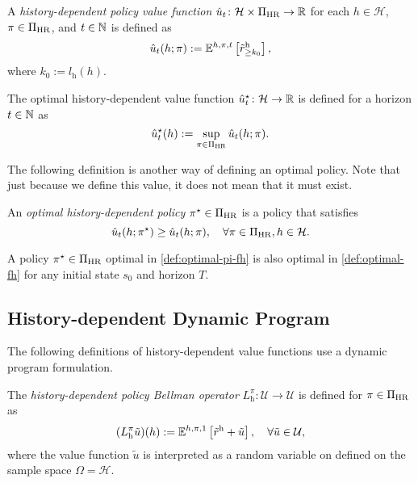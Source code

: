 \begin{definition} \label{def:u-pi}
A \emph{history-dependent policy value function} $\hat{u}_t\colon \mathcal{H} \times \Pi_{\mathrm{HR}} \to \mathbb{R}$ for each $h\in \mathcal{H}$, $\pi \in \Pi_{\mathrm{HR}}$, and $t\in \mathbb{N}$ is defined as
  \[
   \hat{u}_t(h; \pi) := \mathbb{E}^{h, \pi, t} \left[ \tilde{r}^{\mathrm{h}}_{\ge k_0} \right],
 \]
 where $k_0 := l_{\mathrm{h}}(h)$.
  \leanok
\end{definition}


\begin{definition}
The optimal history-dependent value function $\hat{u}_t^{\star}\colon \mathcal{H} \to \mathbb{R}$ is defined for a horizon $t\in \mathbb{N}$ as
 \[
  \hat{u}^{\star}_t(h) := \sup_{\pi\in \Pi_{\mathrm{HR}}} \hat{u}_t(h; \pi). 
 \] 
\end{definition}

The following definition is another way of defining an optimal policy. Note that just because we define this value, it does not mean that it must exist. 
\begin{definition} \label{def:optimal-pi-fh}
An \emph{optimal history-dependent policy} $\pi^{\star} \in \Pi_{\mathrm{HR}}$ is a policy that satisfies
\[
   \hat{u}_t(h; \pi^{\star}) \ge \hat{u}_t(h; \pi), \quad \forall \pi \in \Pi_{\mathrm{HR}}, h\in \mathcal{H}.
 \]
 \leanok
\end{definition}

\begin{definition} \label{def:optimalvf-imp-optimal}
A policy $\pi^{\star} \in \Pi_{\mathrm{HR}}$ optimal in \cref{def:optimal-pi-fh} is also optimal in \cref{def:optimal-fh} for any initial state $s_0$ and horizon $T$.
\end{definition}

\subsection{History-dependent Dynamic Program}

The following definitions of history-dependent value functions use a dynamic program formulation.

\begin{definition} \label{def:DPhpi}
The \emph{history-dependent policy Bellman operator} $L_{\mathrm{h}}^{\pi} \colon \mathcal{U} \to \mathcal{U}$ is defined for $\pi\in \Pi_{\mathrm{HR}}$ as
  \[
    (L_{\mathrm{h}}^{\pi} \tilde{u}) (h)
    :=
    \mathbb{E}^{h, \pi, 1} \left[ \tilde{r}^{\mathrm{h}} + \tilde{u} \right], \quad \forall \tilde{u} \in \mathcal{U},
  \]
  where the value function $\tilde{u}$ is interpreted as a random variable on defined on the sample space $\Omega = \mathcal{H}$.
   \leanok
\end{definition}

